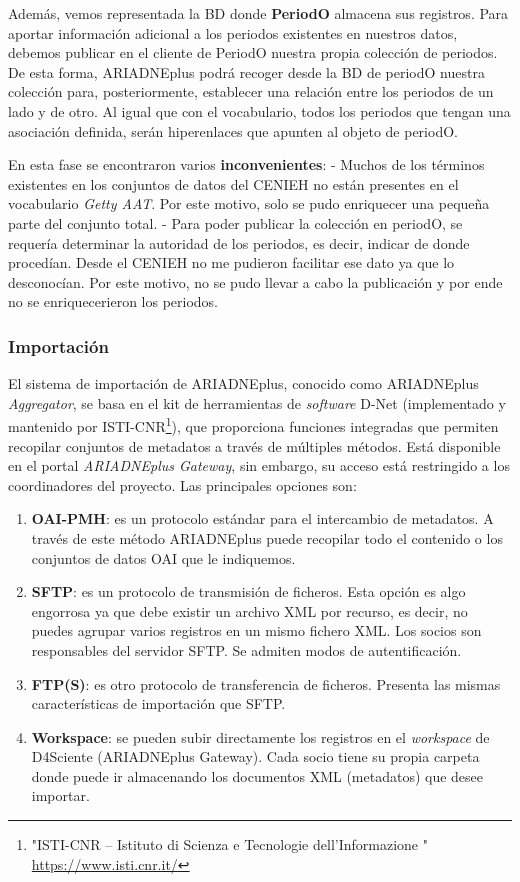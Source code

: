 \documentclass[
]{article}
\providecommand{\tightlist}{%
  \setlength{\itemsep}{0pt}\setlength{\parskip}{0pt}}
\begin{document}
Además, vemos representada la BD donde \textbf{PeriodO} almacena sus
registros. Para aportar información adicional a los periodos existentes
en nuestros datos, debemos publicar en el cliente de PeriodO nuestra
propia colección de periodos. De esta forma, ARIADNEplus podrá recoger
desde la BD de periodO nuestra colección para, posteriormente,
establecer una relación entre los periodos de un lado y de otro. Al
igual que con el vocabulario, todos los periodos que tengan una
asociación definida, serán hiperenlaces que apunten al objeto de
periodO.

En esta fase se encontraron varios \textbf{inconvenientes}: - Muchos de
los términos existentes en los conjuntos de datos del CENIEH no están
presentes en el vocabulario \emph{Getty AAT}. Por este motivo, solo se
pudo enriquecer una pequeña parte del conjunto total. - Para poder
publicar la colección en periodO, se requería determinar la autoridad de
los periodos, es decir, indicar de donde procedían. Desde el CENIEH no
me pudieron facilitar ese dato ya que lo desconocían. Por este motivo,
no se pudo llevar a cabo la publicación y por ende no se enriquecerieron
los periodos.

\hypertarget{importaciuxf3n}{%
\subsubsection{Importación}\label{importaciuxf3n}}

El sistema de importación de ARIADNEplus, conocido como ARIADNEplus
\emph{Aggregator}, se basa en el kit de herramientas de \emph{software}
D-Net (implementado y mantenido por ISTI-CNR\footnote{"ISTI-CNR --
  Istituto di Scienza e Tecnologie dell'Informazione "
  \url{https://www.isti.cnr.it/}}), que proporciona funciones integradas
que permiten recopilar conjuntos de metadatos a través de múltiples
métodos. Está disponible en el portal \emph{ARIADNEplus Gateway}, sin
embargo, su acceso está restringido a los coordinadores del proyecto.
Las principales opciones son:

\begin{enumerate}
\def\labelenumi{\arabic{enumi}.}
\tightlist
\item
  \textbf{OAI-PMH}: es un protocolo estándar para el intercambio de
  metadatos. A través de este método ARIADNEplus puede recopilar todo el
  contenido o los conjuntos de datos OAI que le indiquemos.
\item
  \textbf{SFTP}: es un protocolo de transmisión de ficheros. Esta opción
  es algo engorrosa ya que debe existir un archivo XML por recurso, es
  decir, no puedes agrupar varios registros en un mismo fichero XML. Los
  socios son responsables del servidor SFTP. Se admiten modos de
  autentificación.
\item
  \textbf{FTP(S)}: es otro protocolo de transferencia de ficheros.
  Presenta las mismas características de importación que SFTP.
\item
  \textbf{Workspace}: se pueden subir directamente los registros en el
  \emph{workspace} de D4Sciente (ARIADNEplus Gateway). Cada socio tiene
  su propia carpeta donde puede ir almacenando los documentos XML
  (metadatos) que desee importar.
\end{enumerate}
\end{document}
